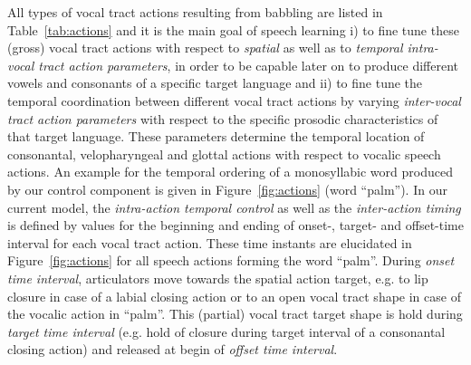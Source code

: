 \documentclass[conference]{IEEEtran}
\begin{document}
All types of vocal tract actions resulting from babbling are listed in
Table~\ref{tab:actions} and it is the main goal of speech learning i)
to fine tune these (gross) vocal tract actions with respect to
\textit{spatial} as well as to \textit{temporal intra-vocal tract
  action parameters}, in order to be capable later on to produce
different vowels and consonants of a specific target language and ii)
to fine tune the temporal coordination between different vocal tract
actions by varying \textit{inter-vocal tract action parameters} with
respect to the specific prosodic characteristics of that target
language. These parameters determine the temporal location of
consonantal, velopharyngeal and glottal actions with respect to
vocalic speech actions. An example for the temporal ordering of a
monosyllabic word produced by our control component is given in
Figure~\ref{fig:actions} (word ``palm''). In our current model, the
\textit{intra-action temporal control} as well as the
\textit{inter-action timing} is defined by values for the beginning
and ending of onset-, target- and offset-time interval for each vocal
tract action. These time instants are elucidated in
Figure~\ref{fig:actions} for all speech actions forming the word
``palm''. During \textit{onset time interval}, articulators move
towards the spatial action target, e.g. to lip closure in case of a
labial closing action or to an open vocal tract shape in case of the
vocalic action in ``palm''. This (partial) vocal tract target shape is
hold during \textit{target time interval} (e.g. hold of closure during
target interval of a consonantal closing action) and released at begin
of \textit{offset time interval}.
\end{document}
